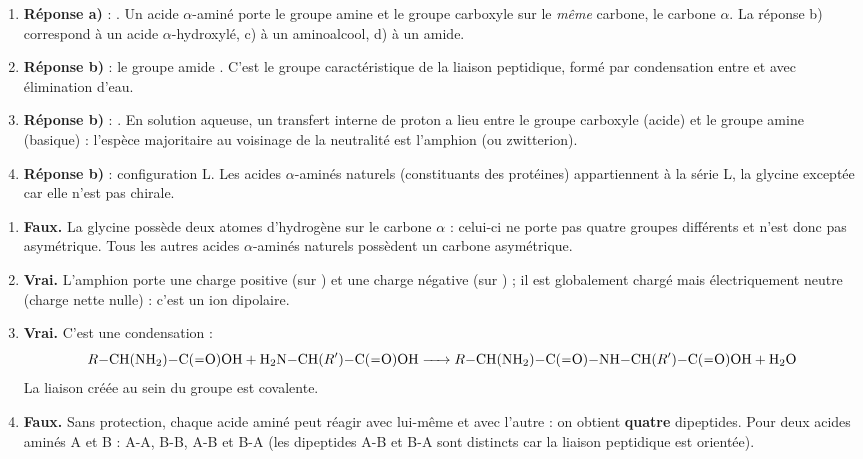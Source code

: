 \documentclass[11pt]{article}
\newcommand{\cle}[1]{{\popxbold\color{popdark}#1}}
\begin{document}
\begin{corrige}
\begin{enumerate}
\item \textbf{Réponse a)} : . Un acide $\alpha$-aminé porte le groupe amine  et le groupe carboxyle  sur le \emph{même} carbone, le carbone $\alpha$. La réponse b) correspond à un acide $\alpha$-hydroxylé, c) à un aminoalcool, d) à un amide.
\item \textbf{Réponse b)} : le groupe \cle{amide} . C'est le groupe caractéristique de la liaison peptidique, formé par condensation entre  et  avec élimination d'eau.
\item \textbf{Réponse b)} : . En solution aqueuse, un transfert interne de proton a lieu entre le groupe carboxyle (acide) et le groupe amine (basique) : l'espèce majoritaire au voisinage de la neutralité est l'\cle{amphion} (ou zwitterion).
\item \textbf{Réponse b)} : configuration \cle{L}. Les acides $\alpha$-aminés naturels (constituants des protéines) appartiennent à la série L, la glycine exceptée car elle n'est pas chirale.
\end{enumerate}
\end{corrige}

\begin{corrige}
\begin{enumerate}
\item \textbf{Faux.} La glycine  possède deux atomes d'hydrogène sur le carbone $\alpha$ : celui-ci ne porte pas quatre groupes différents et n'est donc pas asymétrique. Tous les autres acides $\alpha$-aminés naturels possèdent un carbone asymétrique.
\item \textbf{Vrai.} L'amphion  porte une charge positive (sur ) et une charge négative (sur ) ; il est globalement chargé mais électriquement neutre (charge nette nulle) : c'est un ion dipolaire.
\item \textbf{Vrai.} C'est une condensation :
\[ \ce{$R$-CH(NH2)-C(=O)OH + H2N-CH($R'$)-C(=O)OH -> $R$-CH(NH2)-C(=O)-NH-CH($R'$)-C(=O)OH + H2O} \]
La liaison  créée au sein du groupe  est covalente.
\item \textbf{Faux.} Sans protection, chaque acide aminé peut réagir avec lui-même et avec l'autre : on obtient \textbf{quatre} dipeptides. Pour deux acides aminés A et B : A-A, B-B, A-B et B-A (les dipeptides A-B et B-A sont distincts car la liaison peptidique est orientée).
\end{enumerate}
\end{corrige}
\end{document}
